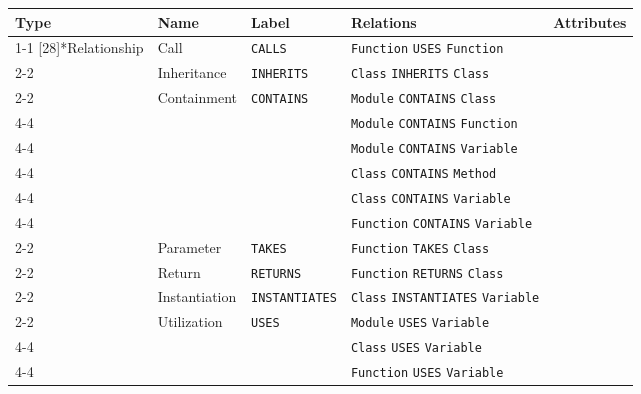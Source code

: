 \begin{tabularx}{\textwidth}{p{1.8cm}lllX}
\toprule
\textbf{Type} & \textbf{Name} & \textbf{Label} & \textbf{Relations} & \textbf{Attributes} \\
\cmidrule{1-1}\cmidrule{2-2}\cmidrule{3-3}\cmidrule{4-4}\cmidrule{5-5}
\multirow{14}[28]{*}{Relationship} & Call & \texttt{CALLS} & \texttt{Function} \texttt{USES} \texttt{Function} &  \\
\cmidrule{2-2}\cmidrule{3-3}\cmidrule{4-4}\cmidrule{5-5}
 & Inheritance & \texttt{INHERITS} & \texttt{Class} \texttt{INHERITS} \texttt{Class} &  \\
\cmidrule{2-2}\cmidrule{3-3}\cmidrule{4-4}\cmidrule{5-5}
 & \multirow{6}[12]{*}{Containment} & \multirow{6}[12]{*}{\texttt{CONTAINS}} & \texttt{Module} \texttt{CONTAINS} \texttt{Class} &  \\
\cmidrule{4-4}\cmidrule{5-5}
 &  &  & \texttt{Module} \texttt{CONTAINS} \texttt{Function} &  \\
\cmidrule{4-4}\cmidrule{5-5}
 &  &  & \texttt{Module} \texttt{CONTAINS} \texttt{Variable} &  \\
\cmidrule{4-4}\cmidrule{5-5}
 &  &  & \texttt{Class} \texttt{CONTAINS} \texttt{Method} &  \\
\cmidrule{4-4}\cmidrule{5-5}
 &  &  & \texttt{Class} \texttt{CONTAINS} \texttt{Variable} &  \\
\cmidrule{4-4}\cmidrule{5-5}
 &  &  & \texttt{Function} \texttt{CONTAINS} \texttt{Variable} &  \\
\cmidrule{2-2}\cmidrule{3-3}\cmidrule{4-4}\cmidrule{5-5}
 & Parameter & \texttt{TAKES} & \texttt{Function} \texttt{TAKES} \texttt{Class} &  \\
\cmidrule{2-2}\cmidrule{3-3}\cmidrule{4-4}\cmidrule{5-5}
 & Return & \texttt{RETURNS} & \texttt{Function} \texttt{RETURNS} \texttt{Class} &  \\
\cmidrule{2-2}\cmidrule{3-3}\cmidrule{4-4}\cmidrule{5-5}
 & Instantiation & \texttt{INSTANTIATES} & \texttt{Class} \texttt{INSTANTIATES} \texttt{Variable} &  \\
\cmidrule{2-2}\cmidrule{3-3}\cmidrule{4-4}\cmidrule{5-5}
 & \multirow{3}[6]{*}{Utilization} & \multirow{3}[6]{*}{\texttt{USES}} & \texttt{Module} \texttt{USES} \texttt{Variable} &  \\
\cmidrule{4-4}\cmidrule{5-5}
 &  &  & \texttt{Class} \texttt{USES} \texttt{Variable} &  \\
\cmidrule{4-4}\cmidrule{5-5}
 &  &  & \texttt{Function} \texttt{USES} \texttt{Variable} &  \\
\bottomrule
\end{tabularx}


